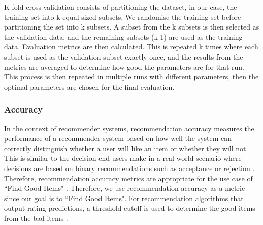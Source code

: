 K-fold cross validation consists of partitioning the dataset, in our case, the training set into k equal sized subsets. We randomise the training set before partitioning the set into k subsets. A subset from the k subsets is then selected as the validation data, and the remaining subsets (k-1) are used as the training data. Evaluation metrics are then calculated. This is repeated k times where each subset is used as the validation subset exactly once, and the results from the metrics are averaged to determine how good the parameters are for that run. This process is then repeated in multiple runs with different parameters, then the optimal parameters are chosen for the final evaluation. 

\subsubsection{}
\subsubsection{}

\subsubsection{ Accuracy}

In the context of recommender systems, recommendation accuracy measures the performance of a recommender system based on how well the system can correctly distinguish whether a user will like an item or whether they will not. This is similar to the decision end users make in a real world scenario where decisions are based on binary recommendations such as acceptance or rejection \cite{zhang}. Therefore, recommendation accuracy metrics are appropriate for the use case of ``Find Good Items" \cite{evaluation}. Therefore, we use recommendation accuracy as a metric since our goal is to ``Find Good Items". For recommendation algorithms that output rating predictions, a threshold-cutoff is used to determine the good items from the bad items \cite{zhang}.

